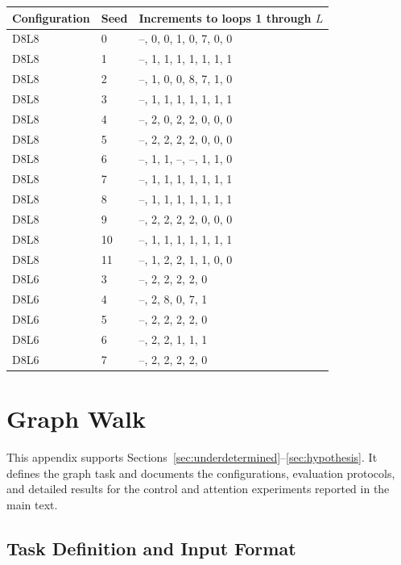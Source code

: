 \documentclass{article}
\begin{document}
\begin{center}\begin{minipage}{\linewidth}\centering
\captionsetup{hypcap=false}
\begin{tabular}{lll}\toprule
Configuration & Seed & Increments to loops 1 through $L$\\\midrule
D8L8 & 0 & --, 0, 0, 1, 0, 7, 0, 0 \\
D8L8 & 1 & --, 1, 1, 1, 1, 1, 1, 1 \\
D8L8 & 2 & --, 1, 0, 0, 8, 7, 1, 0 \\
D8L8 & 3 & --, 1, 1, 1, 1, 1, 1, 1 \\
D8L8 & 4 & --, 2, 0, 2, 2, 0, 0, 0 \\
D8L8 & 5 & --, 2, 2, 2, 2, 0, 0, 0 \\
D8L8 & 6 & --, 1, 1, --, --, 1, 1, 0 \\
D8L8 & 7 & --, 1, 1, 1, 1, 1, 1, 1 \\
D8L8 & 8 & --, 1, 1, 1, 1, 1, 1, 1 \\
D8L8 & 9 & --, 2, 2, 2, 2, 0, 0, 0 \\
D8L8 & 10 & --, 1, 1, 1, 1, 1, 1, 1 \\
D8L8 & 11 & --, 1, 2, 2, 1, 1, 0, 0 \\
D8L6 & 3 & --, 2, 2, 2, 2, 0 \\
D8L6 & 4 & --, 2, 8, 0, 7, 1 \\
D8L6 & 5 & --, 2, 2, 2, 2, 0 \\
D8L6 & 6 & --, 2, 2, 1, 1, 1 \\
D8L6 & 7 & --, 2, 2, 2, 2, 0 \\
\bottomrule\end{tabular}\end{minipage}\end{center}

\clearpage

\section{Graph Walk}
\label{app:main-config}
This appendix supports Sections~\ref{sec:underdetermined}--\ref{sec:hypothesis}. It defines the graph task and documents the configurations, evaluation protocols, and detailed results for the control and attention experiments reported in the main text.

\subsection{Task Definition and Input Format}
\label{app:graph-task}
\end{document}

